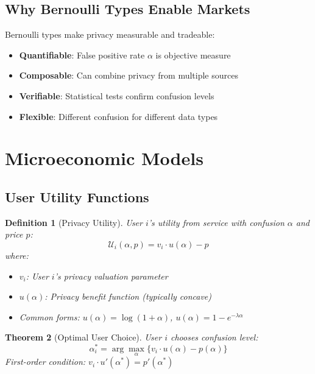 \documentclass[11pt,final]{article}
\newcommand{\Utility}{\mathcal{U}}
\newtheorem{theorem}{Theorem}[section]
\newtheorem{definition}[theorem]{Definition}
\begin{document}
\subsection{Why Bernoulli Types Enable Markets}

Bernoulli types make privacy measurable and tradeable:
\begin{itemize}
    \item \textbf{Quantifiable}: False positive rate $\alpha$ is objective measure
    \item \textbf{Composable}: Can combine privacy from multiple sources
    \item \textbf{Verifiable}: Statistical tests confirm confusion levels
    \item \textbf{Flexible}: Different confusion for different data types
\end{itemize}

\section{Microeconomic Models}

\subsection{User Utility Functions}

\begin{definition}[Privacy Utility]
User $i$'s utility from service with confusion $\alpha$ and price $p$:
\begin{equation}
\Utility_i(\alpha, p) = v_i \cdot u(\alpha) - p
\end{equation}
where:
\begin{itemize}
    \item $v_i$: User $i$'s privacy valuation parameter
    \item $u(\alpha)$: Privacy benefit function (typically concave)
    \item Common forms: $u(\alpha) = \log(1 + \alpha)$, $u(\alpha) = 1 - e^{-\lambda\alpha}$
\end{itemize}
\end{definition}

\begin{theorem}[Optimal User Choice]
User $i$ chooses confusion level:
\begin{equation}
\alpha_i^* = \arg\max_\alpha \{v_i \cdot u(\alpha) - p(\alpha)\}
\end{equation}
First-order condition: $v_i \cdot u'(\alpha^*) = p'(\alpha^*)$
\end{theorem}
\end{document}
